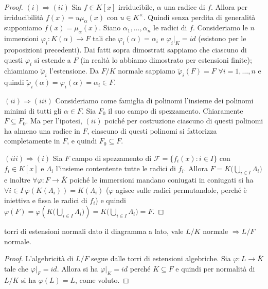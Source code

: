 \begin{proof}
    $(i) \Rightarrow (ii)$ Sia $f \in K[x]$ irriducibile, $\alpha$ una radice di $f$. Allora per irriducibilità $f(x) = u\mu_{\alpha}(x)$ con $u \in K^\times$. Quindi senza perdita di generalità supponiamo $f(x) = \mu_{\alpha}(x)$. Siano $\alpha_1, \dots, \alpha_n$ le radici di $f$. Consideriamo le $n$ immersioni $\varphi_i: K(\alpha) \rightarrow F$ tali che $\varphi_i(\alpha) = \alpha_i$ e $\varphi_i|_K = id$ (esistono per le proposizioni precedenti). Dai fatti sopra dimostrati sappiamo che ciascuno di questi $\varphi_i$ si estende a $F$ (in realtà lo abbiamo dimostrato per estensioni finite); chiamiamo $\tilde \varphi_i$ l'estensione. Da $F/K$ normale sappiamo $\tilde \varphi_i (F) = F$ $\forall i = 1,\dots,n$ e quindi $\tilde \varphi_i(\alpha) = \varphi_i(\alpha) = \alpha_i \in F$.
    
    $(ii) \Rightarrow (iii)$ Consideriamo come famiglia di polinomi l'insieme dei polinomi minimi di tutti gli $\alpha \in F$. Sia $F_0$ il suo campo di spezzamento. Chiaramente $F \subseteq F_0$. Ma per l'ipotesi, $(ii)$ poiché per costruzione ciascuno di questi polinomi ha almeno una radice in $F$, ciascuno di questi polinomi si fattorizza completamente in $F$, e quindi $F_0 \subseteq F$.
    
    $(iii) \Rightarrow (i)$ Sia $F$ campo di spezzamento di $\mathscr{F} = \{f_i(x) : i \in I\}$ con $f_i \in K[x]$ e  $\Lambda_i$ l'insieme contentente tutte le radici di $f_i$. Allora $F = K\big( \bigcup_{i \in I} \Lambda_i \big)$ e inoltre $\forall \varphi: F \rightarrow \overline{K}$ poiché le immersioni mandano coniugati in coniugati si ha $\forall i \in I \ \varphi(K(\Lambda_i)) = K(\Lambda_i)$ ($\varphi$ agisce sulle radici permutandole, perché è iniettiva e fissa le radici di $f_i$) e quindi $\varphi(F) = \varphi(K\big( \bigcup_{i \in I} \Lambda_i \big))= K\big( \bigcup_{i \in I} \Lambda_i \big) = F$.
\end{proof}
\begin{minipage}{0.9\textwidth}  
\begin{theorem}{torri di estensioni normali}
    dato il diagramma a lato, vale $L/K$ normale $\Rightarrow L/F$ normale.
\end{theorem}
\begin{proof}
    L'algebricità di $L/F$ segue dalle torri di estensioni algebriche. Sia $\varphi: L \rightarrow \overline{K}$ tale che $\varphi|_F = id$. Allora si ha $\varphi|_K = id$ perché $K \subseteq F$ e quindi per normalità di $L/K$ si ha $\varphi(L) = L$, come voluto.
\end{proof}
\end{minipage}\hfill
